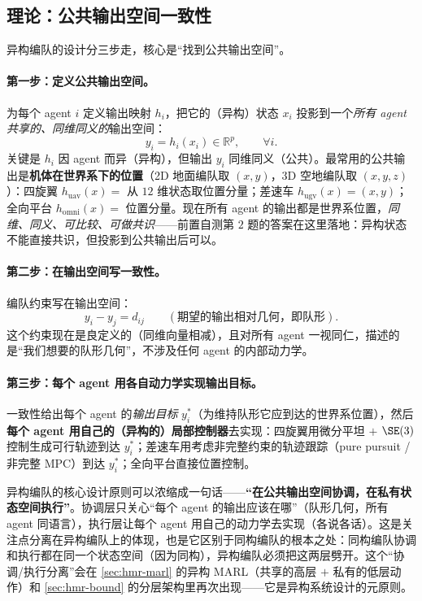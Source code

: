 \subsection{理论：公共输出空间一致性}
\label{sec:hmr-formation-output}
异构编队的设计分三步走，核心是“找到公共输出空间”。

\paragraph{第一步：定义公共输出空间。}
为每个 agent $i$ 定义输出映射 $h_i$，把它的（异构）状态 $x_i$ 投影到一个\emph{所有 agent 共享的、同维同义的}输出空间：
\begin{equation}
  y_i = h_i(x_i) \in \mathbb{R}^p,\qquad \forall i.
  \label{eq:hmr-output-map}
\end{equation}
关键是 $h_i$ 因 agent 而异（异构），但输出 $y_i$ 同维同义（公共）。最常用的公共输出是\textbf{机体在世界系下的位置}（2D 地面编队取 $(x,y)$，3D 空地编队取 $(x,y,z)$）：四旋翼 $h_{\mathrm{uav}}(x)=$ 从 $12$ 维状态取位置分量；差速车 $h_{\mathrm{ugv}}(x)=(x,y)$；全向平台 $h_{\mathrm{omni}}(x)=$ 位置分量。现在所有 agent 的输出都是世界系位置，\emph{同维、同义、可比较、可做共识}——前置自测第 $2$ 题的答案在这里落地：异构状态不能直接共识，但投影到公共输出后可以。

\paragraph{第二步：在输出空间写一致性。}
编队约束写在输出空间：
\begin{equation}
  y_i - y_j = d_{ij}\qquad(\text{期望的输出相对几何，即队形}).
  \label{eq:hmr-output-consensus}
\end{equation}
这个约束现在是良定义的（同维向量相减），且对所有 agent 一视同仁，描述的是“我们想要的队形几何”，不涉及任何 agent 的内部动力学。

\paragraph{第三步：每个 agent 用各自动力学实现输出目标。}
一致性给出每个 agent 的\emph{输出目标} $y_i^\ast$（为维持队形它应到达的世界系位置），然后\textbf{每个 agent 用自己的（异构的）局部控制器}去实现：四旋翼用微分平坦 $+$ $\SE(3)$ 控制生成可行轨迹到达 $y_i^\ast$；差速车用考虑非完整约束的轨迹跟踪（pure pursuit / 非完整 MPC）到达 $y_i^\ast$；全向平台直接位置控制。

\begin{insight}
异构编队的核心设计原则可以浓缩成一句话——\textbf{“在公共输出空间协调，在私有状态空间执行”}。协调层只关心“每个 agent 的输出应该在哪”（队形几何，所有 agent 同语言），执行层让每个 agent 用自己的动力学去实现（各说各话）。这是关注点分离在异构编队上的体现，也是它区别于同构编队的根本之处：同构编队协调和执行都在同一个状态空间（因为同构），异构编队必须把这两层劈开。这个“协调/执行分离”会在 \cref{sec:hmr-marl} 的异构 MARL（共享的高层 $+$ 私有的低层动作）和 \cref{sec:hmr-bound} 的分层架构里再次出现——它是异构系统设计的元原则。
\end{insight}

